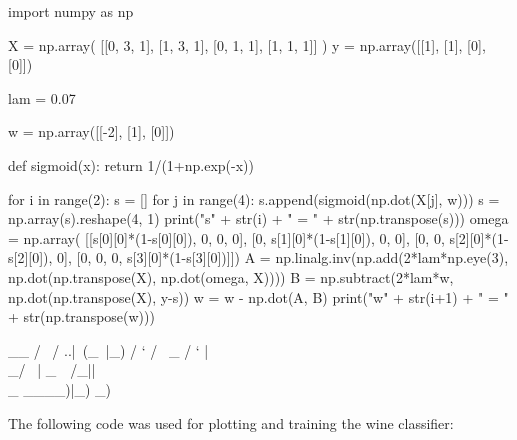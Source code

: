 \documentclass{article}
\begin{document}
\begin{python}
import numpy as np

X = np.array(
    [[0, 3, 1],
    [1, 3, 1],
    [0, 1, 1],
    [1, 1, 1]]
    )
y = np.array([[1], [1], [0], [0]])

lam = 0.07

w = np.array([[-2], [1], [0]])

def sigmoid(x):
    return 1/(1+np.exp(-x))

for i in range(2):
    s = []
    for j in range(4):
        s.append(sigmoid(np.dot(X[j], w)))
    s = np.array(s).reshape(4, 1)
    print("s" + str(i) + " = " + str(np.transpose(s)))
    omega = np.array(
        [[s[0][0]*(1-s[0][0]), 0, 0, 0],
        [0, s[1][0]*(1-s[1][0]), 0, 0],
        [0, 0, s[2][0]*(1-s[2][0]), 0],
        [0, 0, 0, s[3][0]*(1-s[3][0])]])
    A = np.linalg.inv(np.add(2*lam*np.eye(3), np.dot(np.transpose(X), np.dot(omega, X))))
    B = np.subtract(2*lam*w, np.dot(np.transpose(X), y-s))
    w = w - np.dot(A, B)
    print("w" + str(i+1) + " = " + str(np.transpose(w)))
\end{python}
\vskip 1.5in
\begin{python}
         __
        /  \
       / ..|\
      (_\  |_)
      /  \@`
     /     \
_   /  `   |
\\_/  \ | _\
 \    /_|| \\_
  \____)|_) \_)
\end{python}

\newpage

The following code was used for plotting and training the wine classifier:
\end{document}
